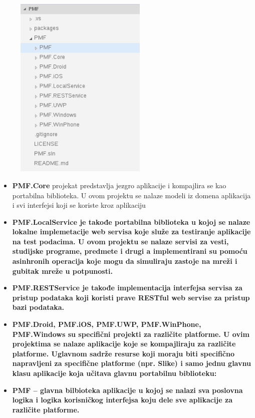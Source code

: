 \documentclass[a4paper]{article}
\newcommand\liststyleLviii{%
\renewcommand\labelitemi{•}
\renewcommand\labelitemii{◦}
\renewcommand\labelitemiii{${\blacksquare}$}
\renewcommand\labelitemiv{•}
}
\begin{document}
\begin{figure}
\centering
\includegraphics[width=62.92mm,height=88.46mm]{msc-img35.png}
\end{figure}
\liststyleLviii
\begin{itemize}
\item \textbf{PMF.Core} projekat predstavlja jezgro aplikacije i
kompajlira se kao portabilna biblioteka. U ovom projektu se nalaze
modeli iz domena aplikacija i svi interfejsi koji se koriste kroz
aplikaciju
\item {\bfseries
PMF.LocalService \textmd{je takođe portabilna biblioteka u kojoj se
nalaze lokalne implemetacije web servisa koje služe za testiranje
aplikacije na test podacima. U ovom projektu se nalaze servisi za
vesti, studijske programe, predmete i drugi a implementirani su pomoću
asinhronih operacija koje mogu da simuliraju zastoje na mreži i gubitak
mreže u potpunosti.}}
\item {\bfseries
PMF.RESTService \textmd{je takođe implementacija interfejsa servisa za
pristup podataka koji koristi prave RESTful web servise za pristup bazi
podataka.}}
\item {\bfseries
PMF.Droid, PMF.iOS, PMF.UWP, PMF.WinPhone, PMF.Windows \textmd{su
specifični projekti za različite platforme. U ovim projektima se nalaze
aplikacije koje se kompajliraju za različite platforme. Uglavnom sadrže
resurse koji moraju biti specifično napravljeni za specifične platforme
(npr. Slike) i samo jednu glavnu klasu aplikacije koja učitava glavnu
portabilnu biblioteku:}}
\item {\bfseries
PMF –\textmd{ glavna bilbioteka aplikacije u kojoj se nalazi sva
poslovna logika i logika korisničkog interfejsa koju dele sve
aplikacije za različite platforme.}}
\end{itemize}
\end{document}
